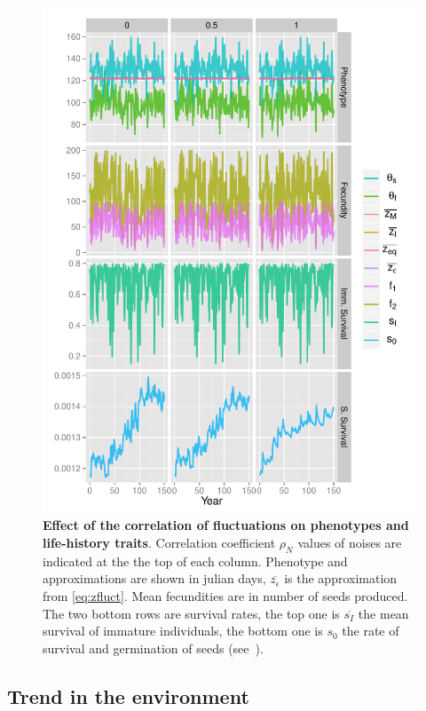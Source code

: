 \begin{figure}[ht!]
	\centering
	\includegraphics[scale=1]{Figures/PhenoLHTwithCorr.pdf}
	\caption{\textbf{Effect of the correlation of fluctuations on phenotypes and life-history traits}. Correlation coefficient $\rho_{N}$ values of noises are indicated at the the top of each column. Phenotype and approximations are shown in julian days, $\overline{z_\epsilon}$ is the approximation from \autoref{eq:zfluct}. Mean fecundities are in number of seeds produced. The two bottom rows are survival rates, the top one is $\overline{s_I}$ the mean survival of immature individuals, the bottom one is $s_0$ the rate of survival and germination of seeds (see~).}
	\label{fig:corr}
\end{figure}

\subsection*{Trend in the environment}

